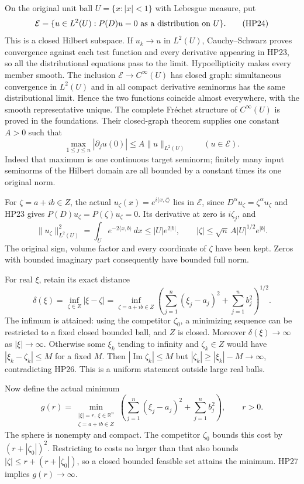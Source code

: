 \documentclass[
  11pt,
]{article}
\begin{document}
On the original unit ball \(U=\{x:|x|<1\}\) with Lebesgue measure, put
\[
\mathcal E=\{u\in L^2(U):P(D)u=0\hbox{ as a distribution on }U\}.
\tag{HP24}
\] This is a closed Hilbert subspace. If \(u_k\to u\) in \(L^2(U)\),
Cauchy--Schwarz proves convergence against each test function and every
derivative appearing in HP23, so all the distributional equations pass
to the limit. Hypoellipticity makes every member smooth. The inclusion
\(\mathcal E\to C^\infty(U)\) has closed graph: simultaneous convergence
in \(L^2(U)\) and in all compact derivative seminorms has the same
distributional limit. Hence the two functions coincide almost
everywhere, with the smooth representative unique. The complete Fréchet
structure of \(C^\infty(U)\) is proved in the foundations. Their
closed-graph theorem supplies one constant \(A>0\) such that \[
\max_{1\leq j\leq n}|\partial_j u(0)|
\leq A\|u\|_{L^2(U)}\qquad(u\in\mathcal E).
\tag{HP25}
\] Indeed that maximum is one continuous target seminorm; finitely many
input seminorms of the Hilbert domain are all bounded by a constant
times its one original norm.

For \(\zeta=a+ib\in Z\), the actual
\(u_\zeta(x)=e^{i\langle x,\zeta\rangle}\) lies in \(\mathcal E\), since
\(D^\alpha u_\zeta=\zeta^\alpha u_\zeta\) and HP23 gives
\(P(D)u_\zeta=P(\zeta)u_\zeta=0\). Its derivative at zero is
\(i\zeta_j\), and \[
\|u_\zeta\|_{L^2(U)}^2
=\int_U e^{-2\langle x,b\rangle}\,dx
\leq |U|e^{2|b|},
\qquad
|\zeta|\leq\sqrt n\,A|U|^{1/2}e^{|b|}.
\tag{HP26}
\] The original sign, volume factor and every coordinate of \(\zeta\)
have been kept. Zeros with bounded imaginary part consequently have
bounded full norm.

For real \(\xi\), retain its exact distance \[
\delta(\xi)=\inf_{\zeta\in Z}|\xi-\zeta|
=\inf_{\zeta=a+ib\in Z}
\left(\sum_{j=1}^{n}(\xi_j-a_j)^2+\sum_{j=1}^{n}b_j^2\right)^{1/2}.
\tag{HP27}
\] The infimum is attained: using the competitor \(\zeta_0\), a
minimizing sequence can be restricted to a fixed closed bounded ball,
and \(Z\) is closed. Moreover \(\delta(\xi)\to\infty\) as
\(|\xi|\to\infty\). Otherwise some \(\xi_k\) tending to infinity and
\(\zeta_k\in Z\) would have \(|\xi_k-\zeta_k|\leq M\) for a fixed \(M\).
Then \(|\operatorname{Im}\zeta_k|\leq M\) but
\(|\zeta_k|\geq|\xi_k|-M\to\infty\), contradicting HP26. This is a
uniform statement outside large real balls.

Now define the actual minimum \[
g(r)=\min_{\substack{|\xi|=r,\ \xi\in\mathbb R^n\\
                    \zeta=a+ib\in Z}}
\left(\sum_{j=1}^{n}(\xi_j-a_j)^2+\sum_{j=1}^{n}b_j^2\right),
\qquad r>0.
\tag{HP28}
\] The sphere is nonempty and compact. The competitor \(\zeta_0\) bounds
this cost by \((r+|\zeta_0|)^2\). Restricting to costs no larger than
that also bounds \(|\zeta|\leq r+(r+|\zeta_0|)\), so a closed bounded
feasible set attains the minimum. HP27 implies \(g(r)\to\infty\).
\end{document}
